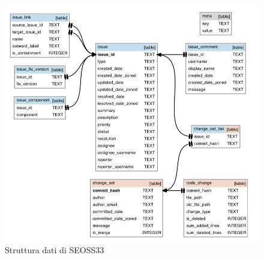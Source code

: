 \documentclass[%
    corpo=12pt,
    twoside,
    oldstyle,
    autoretitolo,
    greek,
    evenboxes,
]{toptesi}
\begin{document}
\begin{figure}[!ht]
  \includegraphics[width=\linewidth]{figure/seoss33_db_schema.png}
  \caption{Struttura dati di SEOSS33}
  \label{fig:seoss33_db}
\end{figure}
\end{document}
